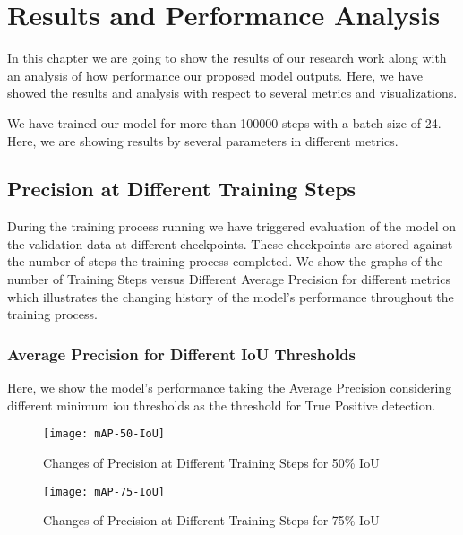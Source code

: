 \chapter{Results and Performance Analysis}
    In this chapter we are going to show the results of our research work along with an analysis of how performance our proposed model outputs. Here, we have showed the results and analysis with respect to several metrics and visualizations.
    
    We have trained our model for more than 100000 steps with a batch size of 24. Here, we are showing results by several parameters in different metrics.
    
    \section{Precision at Different Training Steps}
        During the training process running we have triggered evaluation of the model on the validation data at different checkpoints. These checkpoints are stored against the number of steps the training process completed.
        We show the graphs of the number of Training Steps versus Different Average Precision for different metrics which illustrates the changing history of the model's performance throughout the training process.
        
        \subsection{Average Precision for Different IoU Thresholds}
            Here, we show the model's performance taking the Average Precision considering different minimum \acrfull{iou} thresholds as the threshold for True Positive detection.
                        
            \begin{figure}
                \centering
                \texttt{[image: mAP-50-IoU]}
                \caption{Changes of Precision at Different Training Steps for 50\% IoU}
                \label{fig:precision_iou50}
            \end{figure}
            
            \begin{figure}
                \centering
                \texttt{[image: mAP-75-IoU]}
                \caption{Changes of Precision at Different Training Steps for 75\% IoU}
                \label{fig:precision_iou75}
            \end{figure}
            
